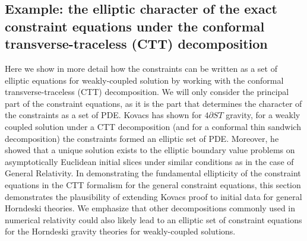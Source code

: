 \documentclass{ws-ijmpd}
\begin{document}
\subsection{Example: the elliptic character of the exact constraint equations
   under the conformal transverse-traceless (CTT) decomposition 
\label{eq:elliptic_character_constraints}
}
Here we show in more detail how the constraints can be written as
a set of elliptic equations for weakly-coupled solution
by working with the conformal
transverse-traceless (CTT) decomposition\cite{1979sgrr.work...83Y}.
We will only consider the principal part of the
constraint equations, as it is the part that determines the
character of the constraints as a set of PDE.
Kovacs\cite{Kovacs:2021lgk} has shown for $4\partial ST$ gravity, 
for a weakly coupled solution under a 
CTT decomposition (and for a conformal thin sandwich decomposition)
the constraints formed an elliptic set of PDE. 
Moreover, he showed that a unique solution exists to the elliptic boundary
value problems on asymptotically Euclidean initial slices 
under similar conditions as in the case of General Relativity.
In demonstrating the fundamental ellipticity of the constraint equations in
the CTT formalism for the general constraint equations, this section 
demonstrates the plausibility of 
extending Kovacs proof to initial data for general Horndeski theories.
We emphasize that other decompositions commonly used in numerical relativity
could also likely lead to an elliptic set of constraint equations
for the Horndeski gravity theories for weakly-coupled solutions.
\end{document}
